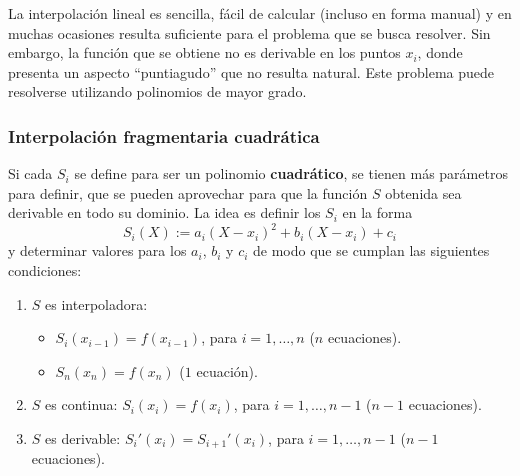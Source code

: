 
La interpolación lineal es sencilla, fácil de calcular (incluso en forma
manual) y en muchas ocasiones resulta suficiente para el problema que se
busca resolver. Sin embargo, la función que se obtiene no es derivable en
los puntos $x_i$, donde presenta un aspecto ``puntiagudo'' que no resulta
natural. Este problema puede resolverse utilizando polinomios de mayor grado.

\subsubsection{Interpolación fragmentaria cuadrática}
Si cada $S_i$ se define para ser un polinomio \textbf{cuadrático}, se tienen más
parámetros para definir, que se pueden aprovechar para que la función $S$
obtenida sea derivable en todo su dominio. La idea es definir los $S_i$ en
la forma
\[ S_i(X) := a_i (X - x_i)^2 + b_i (X - x_i) + c_i \]
y determinar valores para los $a_i$, $b_i$ y $c_i$ de modo que se cumplan las
siguientes condiciones:

\begin{enumerate}[label=(\roman*)]
\item $S$ es interpoladora:
    \begin{itemize}
    \item $S_i(x_{i-1}) = f(x_{i-1})$, para $i = 1, \dots, n$ ($n$ ecuaciones).
    \item $S_n(x_n) = f(x_n)$ ($1$ ecuación).
    \end{itemize}
\item $S$ es continua:
    $S_i(x_i) = f(x_i)$, para $i = 1, \dots, n-1$ ($n-1$ ecuaciones).
\item $S$ es derivable:
    $S_i'(x_i) = S_{i+1}'(x_i)$, para $i = 1, \dots, n-1$ ($n-1$ ecuaciones).
\end{enumerate}


